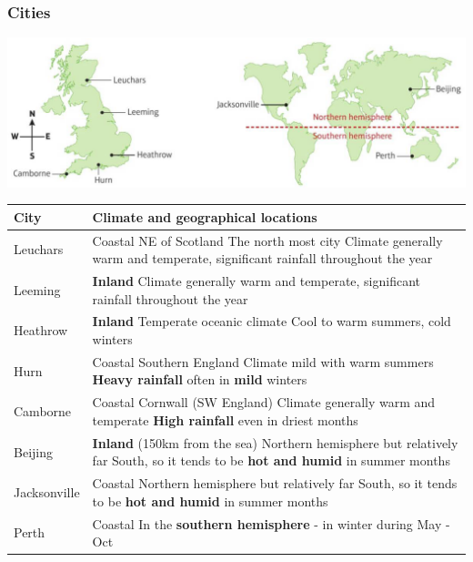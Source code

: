 \documentclass[A4paper, 11pt]{article}
\begin{document}
	\subsubsection{Cities}
	\includegraphics{LDSmap}\\
	\begin{tabular}{|p{2cm}|p{15cm}|}
		\hline
		\textbf{City} & \textbf{Climate and geographical locations} \\
		\hline
		Leuchars & Coastal \newline NE of Scotland \newline The north most city \newline Climate generally warm and temperate, significant rainfall throughout the year\\
		\hline
		Leeming & \textbf{Inland} \newline Climate generally warm and temperate, significant rainfall throughout the year\\
		\hline
		Heathrow  & \textbf{Inland} \newline Temperate oceanic climate \newline Cool to warm summers, cold winters\\
		\hline
		Hurn  & Coastal \newline Southern England \newline Climate mild with warm summers \newline \textbf{Heavy rainfall} often in \textbf{mild} winters\\
		\hline
		Camborne & Coastal \newline Cornwall (SW England) \newline Climate generally warm and temperate \newline \textbf{High rainfall} even in driest months\\
		\hline
		Beijing  & \textbf{Inland} (150km from the sea) \newline Northern hemisphere but relatively far South, so it tends to be \textbf{hot and humid} in summer months\\
		\hline
		Jacksonville  & Coastal \newline Northern hemisphere but relatively far South, so it tends to be \textbf{hot and humid} in summer months \\
		\hline
		Perth & Coastal \newline In the \textbf{southern hemisphere} - in winter during May - Oct\\
		\hline
	\end{tabular}
	
\end{document}
